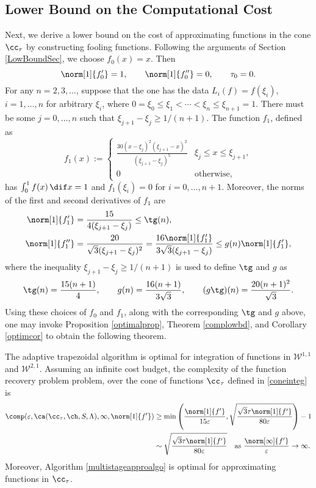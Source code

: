 \subsection{Lower Bound on the Computational Cost}
Next, we derive a lower bound on the cost of approximating functions in the cone $\cc_{\tau}$ by constructing fooling functions. Following the arguments of Section \ref{LowBoundSec}, we choose  $f_0(x)=x.$ Then
\[
\norm[1]{f'_0}=1, \qquad \norm[1]{f''_0}=0, \qquad \tau_0=0.
\]
For any $n =2, 3, \ldots$, suppose that the one has the data $L_i(f)=f(\xi_i)$, $i=1, \ldots, n$ for arbitrary $\xi_i$, where $0=\xi_0 \le \xi_1 < \cdots < \xi_n \le \xi_{n+1} = 1$.  There must be some $j=0, \ldots, n$ such that $\xi_{j+1} - \xi_j \ge 1/(n+1)$.  The function $f_{1}$, defined as
$$
f_{1}(x):=\begin{cases} \displaystyle
\frac{30(x-\xi_{j})^{2}(\xi_{j+1}-x)^{2}}{(\xi_{j+1}-\xi_{j})^5} & \xi_{j} \le x \leq \xi_{j+1},\\
0 & \text{otherwise},
\end{cases}
$$
has $\int_0^1 f(x) \, \dif x=1$ and $f_1(\xi_i)=0$ for $i=0, \ldots, n+1$.  Moreover, the norms of the first and second derivatives of $f_1$ are
\begin{align*}
\norm[1]{f'_1}&=\frac{15}{4(\xi_{j+1}-\xi_{j})}\leq \tg(n),\\
\norm[1]{f''_1}&=\frac{20}{\sqrt{3}(\xi_{j+1}-\xi_{j})^2}
=\frac{16\norm[1]{f'_1}}{3\sqrt{3}(\xi_{j+1}-\xi_{j})}
 \leq g(n) \norm[1]{f'_1},
\end{align*}
where the inequality $\xi_{j+1} - \xi_j \ge 1/(n+1)$ is used to define $\tg$ and $g$ as
\[
\tg(n) = \frac{15(n+1)}{4}, \qquad g(n) = \frac{16(n+1)}{3\sqrt{3}}, \qquad (g\tg)(n) = \frac{20(n+1)^2}{\sqrt{3}}.
\]
Using these choices of $f_0$ and $f_1$, along with the corresponding $\tg$ and $g$ above, one may invoke Proposition \ref{optimalprop}, Theorem \ref{complowbd}, and Corollary \ref{optimcor} to obtain the following theorem.

\begin{theorem} \label{complowbdappr} The adaptive trapezoidal algorithm is optimal for integration of functions in $\mathcal{W}^{1,1}$ and $\mathcal{W}^{2,1}$. Assuming an infinite cost budget, the complexity of the function recovery problem problem, over the cone of functions $\cc_{\tau}$ defined in \eqref{coneinteg} is
\begin{align*}
\comp(\varepsilon,\ca(\cc_{\tau},\ch,S,\Lambda),\infty,\norm[1]{f'})
&\ge \min\left(\frac{\norm[1]{f'}}{15 \varepsilon}, \sqrt{\frac{\sqrt{3}\tau\norm[1]{f'}}{80\varepsilon}} \right)-1\\
& \sim \sqrt{\frac{\sqrt{3}\tau\norm[1]{f'}}{80\varepsilon}}  \quad\text{as } \frac{\norm[\infty]{f'}}{\varepsilon} \to \infty.
\end{align*}
Moreover, Algorithm \ref{multistageapproalgo} is optimal for approximating functions in $\cc_{\tau}$.
\end{theorem}

